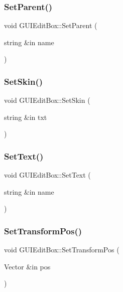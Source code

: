 \subsubsection{\texorpdfstring{Set\+Parent()}{SetParent()}}
{\footnotesize\ttfamily void G\+U\+I\+Edit\+Box\+::\+Set\+Parent (\begin{DoxyParamCaption}\item[{string \&in}]{name }\end{DoxyParamCaption})}

\hypertarget{class_g_u_i_edit_box_a4da1ea739fdaca6aae9a06d1d2f8749b}{}\label{class_g_u_i_edit_box_a4da1ea739fdaca6aae9a06d1d2f8749b} 
\subsubsection{\texorpdfstring{Set\+Skin()}{SetSkin()}}
{\footnotesize\ttfamily void G\+U\+I\+Edit\+Box\+::\+Set\+Skin (\begin{DoxyParamCaption}\item[{string \&in}]{txt }\end{DoxyParamCaption})}

\hypertarget{class_g_u_i_edit_box_a81739450f27d78e39368985b4581e12f}{}\label{class_g_u_i_edit_box_a81739450f27d78e39368985b4581e12f} 
\subsubsection{\texorpdfstring{Set\+Text()}{SetText()}}
{\footnotesize\ttfamily void G\+U\+I\+Edit\+Box\+::\+Set\+Text (\begin{DoxyParamCaption}\item[{string \&in}]{name }\end{DoxyParamCaption})}

\hypertarget{class_g_u_i_edit_box_a4385823fa2e13a49e84f229dfa8d5cdc}{}\label{class_g_u_i_edit_box_a4385823fa2e13a49e84f229dfa8d5cdc} 
\subsubsection{\texorpdfstring{Set\+Transform\+Pos()}{SetTransformPos()}}
{\footnotesize\ttfamily void G\+U\+I\+Edit\+Box\+::\+Set\+Transform\+Pos (\begin{DoxyParamCaption}\item[{Vector \&in}]{pos }\end{DoxyParamCaption})}

